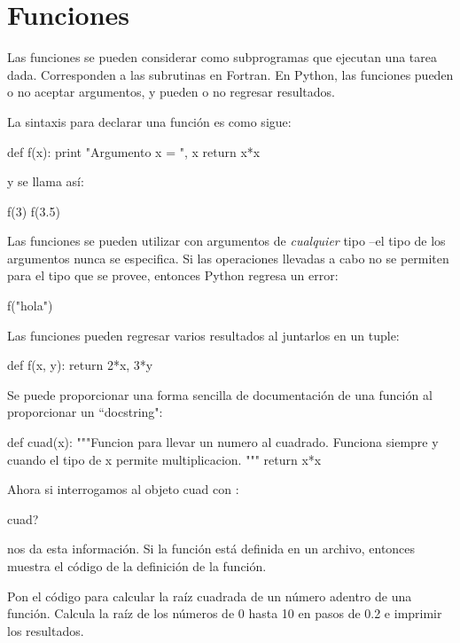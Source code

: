 \section{Funciones}
Las funciones se pueden considerar como subprogramas que ejecutan una tarea dada. Corresponden a las subrutinas en Fortran. En Python, las funciones pueden o no aceptar argumentos, y pueden o no regresar resultados.

La sintaxis para declarar una función es como sigue:
\begin{python}
def f(x):
  print "Argumento x = ", x
  return x*x
\end{python}
y se llama así:
\begin{python}
f(3)
f(3.5)
\end{python}

Las funciones se pueden utilizar con argumentos de \emph{cualquier} tipo --el tipo de los argumentos nunca se especifica. Si las operaciones llevadas a cabo no se permiten para el tipo que se provee, entonces Python regresa un error:
\begin{python}
f("hola")
\end{python}

Las funciones pueden regresar varios resultados al juntarlos en un tuple:
\begin{python}
def f(x, y):
  return 2*x, 3*y
\end{python}

Se puede proporcionar una forma sencilla de documentación de una función al proporcionar un ``docstring":
\begin{python}
def cuad(x):
  """Funcion para llevar un numero al cuadrado.
  Funciona siempre y cuando el tipo de x permite multiplicacion.
  """
  return x*x
\end{python}
Ahora si interrogamos al objeto cuad con :
\begin{python}
cuad?
\end{python}
nos da esta información. Si la función está definida en un archivo, entonces
 muestra el código de la definición de la función.

\ej Pon el código para calcular la raíz cuadrada de un número adentro de una función. Calcula la raíz de los números de 0 hasta 10 en pasos de 0.2 e imprimir los resultados.





